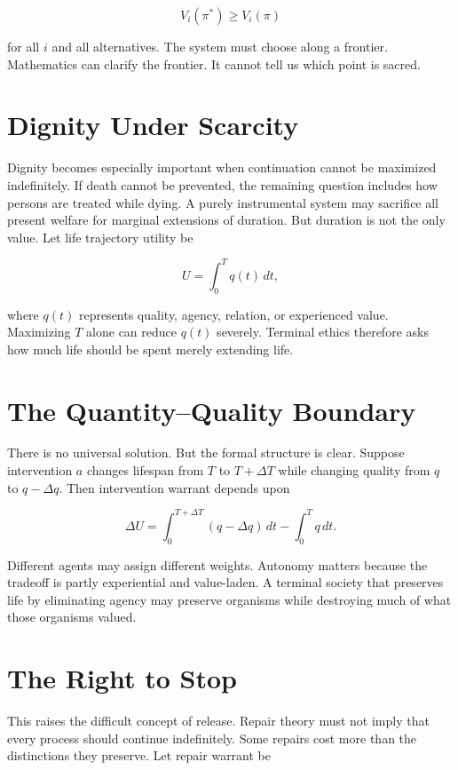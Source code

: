 \documentclass[11pt,oneside]{book}
\theoremstyle{definition}
\theoremstyle{remark}
\begin{document}
\[
V_i(\pi^\ast) \geq V_i(\pi)
\]

for all \(i\) and all alternatives. The system must choose along a frontier. Mathematics can clarify
the frontier. It cannot tell us which point is sacred.

\section{Dignity Under Scarcity}

Dignity becomes especially important when continuation cannot be maximized indefinitely. If death
cannot be prevented, the remaining question includes how persons are treated while dying. A purely
instrumental system may sacrifice all present welfare for marginal extensions of duration. But
duration is not the only value. Let life trajectory utility be

\[
U = \int_0^T q(t)\,dt,
\]

where \(q(t)\) represents quality, agency, relation, or experienced value. Maximizing \(T\) alone
can reduce \(q(t)\) severely. Terminal ethics therefore asks how much life should be spent merely
extending life.

\section{The Quantity--Quality Boundary}

There is no universal solution. But the formal structure is clear. Suppose intervention \(a\)
changes lifespan from \(T\) to \(T+\Delta T\) while changing quality from \(q\) to \(q-\Delta q\).
Then intervention warrant depends upon

\[
\Delta U = \int_0^{T+\Delta T}(q-\Delta q)\,dt - \int_0^Tq\,dt.
\]

Different agents may assign different weights. Autonomy matters because the tradeoff is partly
experiential and value-laden. A terminal society that preserves life by eliminating agency may
preserve organisms while destroying much of what those organisms valued.

\section{The Right to Stop}

This raises the difficult concept of release. Repair theory must not imply that every process should
continue indefinitely. Some repairs cost more than the distinctions they preserve. Let repair
warrant be
\end{document}
